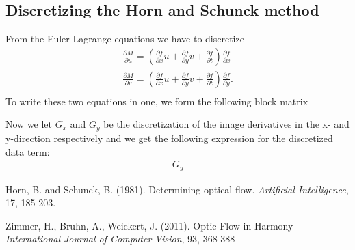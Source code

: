 \documentclass[10pt,a4paper]{article}
\begin{document}
\subsection{Discretizing the Horn and Schunck method}
From the Euler-Lagrange equations we have to discretize
\begin{equation}
\begin{aligned}
\frac{\partial M}{\partial u} = (\frac{\partial f}{\partial x}u + \frac{\partial f}{\partial y}v + \frac{\partial f}{\partial t}) \frac{\partial f}{\partial x} \\
\frac{\partial M}{\partial v} = (\frac{\partial f}{\partial x}u + \frac{\partial f}{\partial y}v + \frac{\partial f}{\partial t}) \frac{\partial f}{\partial y}. \\
\end{aligned}
\end{equation}
To write these two equations in one, we form the following block matrix




Now we let $G_x$ and $G_y$ be the discretization of the image derivatives in the x- and y-direction respectively and  we get the following expression for the discretized data term:
\begin{align*}
G_y
\end{align*}

\begin{thebibliography}{}

Horn, B. and Schunck, B. (1981). Determining optical flow. \emph{Artificial Intelligence}, 17, 185-203.

Zimmer, H., Bruhn, A., Weickert, J. (2011). Optic Flow in Harmony \emph{International Journal of Computer Vision}, 93, 368-388

\end{thebibliography}
\end{document}
